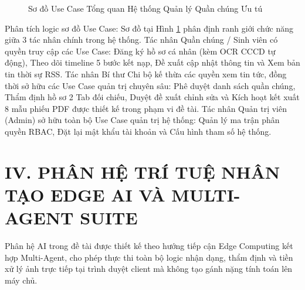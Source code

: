 \documentclass[12pt,a4paper]{report}
\begin{document}
\begin{figure}[htbp]
{%
  }
  \caption{Sơ đồ Use Case Tổng quan Hệ thống Quản lý Quần chúng Ưu tú}
  \label{fig:usecase_overview}
  \vspace{0.2em}
\end{figure}

Phân tích logic sơ đồ Use Case: Sơ đồ tại Hình \ref{fig:usecase_overview} phân định ranh giới chức năng giữa 3 tác nhân chính trong hệ thống. Tác nhân Quần chúng / Sinh viên có quyền truy cập các Use Case: Đăng ký hồ sơ cá nhân (kèm OCR CCCD tự động), Theo dõi timeline 5 bước kết nạp, Đề xuất cập nhật thông tin và Xem bản tin thời sự RSS. Tác nhân Bí thư Chi bộ kế thừa các quyền xem tin tức, đồng thời sở hữu các Use Case quản trị chuyên sâu: Phê duyệt danh sách quần chúng, Thẩm định hồ sơ 2 Tab đối chiếu, Duyệt đề xuất chỉnh sửa và Kích hoạt kết xuất 8 mẫu phiếu PDF được thiết kế trong phạm vi đề tài. Tác nhân Quản trị viên (Admin) sở hữu toàn bộ Use Case quản trị hệ thống: Quản lý ma trận phân quyền RBAC, Đặt lại mật khẩu tài khoản và Cấu hình tham số hệ thống.

\section*{IV. PHÂN HỆ TRÍ TUỆ NHÂN TẠO EDGE AI VÀ MULTI-AGENT SUITE}

Phân hệ AI trong đề tài được thiết kế theo hướng tiếp cận Edge Computing kết hợp Multi-Agent, cho phép thực thi toàn bộ logic nhận dạng, thẩm định và tiền xử lý ảnh trực tiếp tại trình duyệt client mà không tạo gánh nặng tính toán lên máy chủ.
\end{document}
